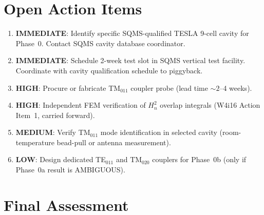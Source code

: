 \documentclass[11pt]{article}
\newcommand{\Heff}{H_n}
\theoremstyle{definition}
\theoremstyle{remark}
\begin{document}
\section{Open Action Items}
\label{sec:actions}

\begin{enumerate}
\item \textbf{IMMEDIATE}: Identify specific SQMS-qualified TESLA 9-cell
  cavity for Phase~0. Contact SQMS cavity database coordinator.
\item \textbf{IMMEDIATE}: Schedule 2-week test slot in SQMS vertical
  test facility. Coordinate with cavity qualification schedule to
  piggyback.
\item \textbf{HIGH}: Procure or fabricate TM$_{011}$ coupler probe
  (lead time $\sim 2$--4 weeks).
\item \textbf{HIGH}: Independent FEM verification of $\Heff^2$ overlap
  integrals (W4i16 Action Item~1, carried forward).
\item \textbf{MEDIUM}: Verify TM$_{011}$ mode identification in
  selected cavity (room-temperature bead-pull or antenna measurement).
\item \textbf{LOW}: Design dedicated TE$_{011}$ and TM$_{020}$ couplers
  for Phase~0b (only if Phase~0a result is AMBIGUOUS).
\end{enumerate}


\section{Final Assessment}
\end{document}
